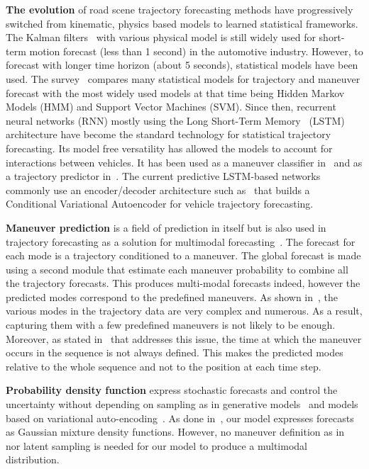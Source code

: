 \documentclass[a4paper, 10pt, conference]{ieeeconf}      %
\begin{document}
\textbf{The evolution} of road scene trajectory forecasting methods have progressively switched from kinematic, physics based models to learned
statistical frameworks.
The Kalman filters~\cite{Kalman1960} with various physical model is still widely used for short-term motion
forecast (less than 1 second) in the automotive industry.
However, to forecast with longer time horizon (about 5 seconds), statistical models have been used.
The survey~\cite{Lefevre2014} compares many statistical models for trajectory and maneuver forecast
with the most widely used models at that time being Hidden Markov Models (HMM) and Support Vector Machines (SVM).
Since then, recurrent neural networks (RNN) mostly using the Long Short-Term Memory~\cite{Hochreiter1997} (LSTM)
architecture have become the standard technology for statistical trajectory forecasting.
Its model free versatility has allowed the models to account for interactions between vehicles.
It has been used as a maneuver classifier in~\cite{Khosroshahi2016} and as a trajectory predictor in~\cite{Altche2017}.
The current predictive LSTM-based networks commonly use an encoder/decoder architecture such as~\cite{Hu2018}
that builds a Conditional Variational Autoencoder for vehicle trajectory forecasting.

\textbf{Maneuver prediction} is a field of prediction in itself but is also used in trajectory forecasting
as a solution for multimodal forecasting~\cite{Hu2018, Houenou2013, Deo2018}.
The forecast for each mode is a trajectory conditioned to a maneuver.
The global forecast is made using a second module that estimate each maneuver probability to combine all
the trajectory forecasts.
This produces multi-modal forecasts indeed, however the predicted modes correspond to the predefined maneuvers.
As shown in~\cite{Shouno2018}, the various modes in the trajectory data are very complex and numerous.
As a result, capturing them with a few predefined maneuvers is not likely to be enough.
Moreover, as stated in~\cite{Wissing2018} that addresses this issue, the time at which the maneuver occurs in the sequence
is not always defined.
This makes the predicted modes relative to the whole sequence and not to the position at each time step.

\textbf{Probability density function} express stochastic forecasts and control the
uncertainty without depending on sampling as in generative models~\cite{Kuefler2017} and models based on variational
auto-encoding~\cite{Lenz2017, Hu2018}.
As done in~\cite{Lenz2017, Deo2018}, our model expresses forecasts as Gaussian mixture density functions.
However, no maneuver definition as in~\cite{Deo2018} nor latent sampling is needed for our model to
produce a multimodal distribution.
\end{document}
